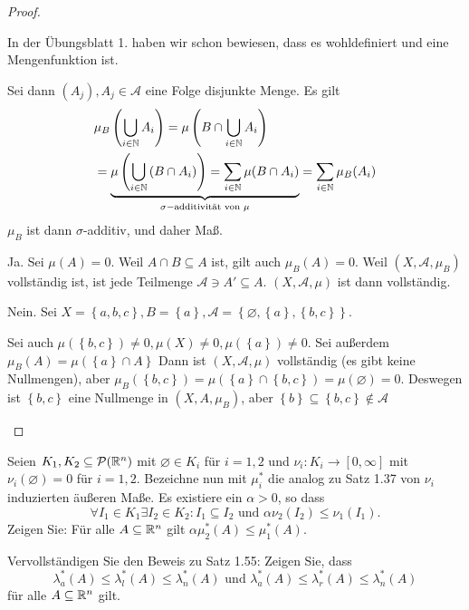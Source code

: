 \begin{proof}
	\begin{parts}
	\item In der Übungsblatt 1. haben wir schon bewiesen, dass es wohldefiniert und eine Mengenfunktion ist.

		Sei dann $(A_j), A_j\in \mathcal{A}$ eine Folge disjunkte Menge. Es gilt
	\begin{align*}
		&\mu_B\left( \bigcup_{i\in\mathbb{N}} A_i \right) =\mu\left( B\cap \bigcup_{i\in \mathbb{N}} A_i \right)\\
		&=\underbrace{\mu\left( \bigcup_{i\in \mathbb{N}} \left( B \cap A_i \right)  \right)=\sum_{i\in \mathbb{N}}\mu(B\cap A_i)}_{\sigma-\text{additivität von }\mu}=\sum_{i\in \mathbb{N}}\mu_B(A_i)
	\end{align*}
		$\mu_B$ ist dann $\sigma$-additiv, und daher Maß.
	\item Ja. Sei $\mu(A)=0$. Weil $A\cap B\subseteq A$ ist, gilt auch $\mu_B(A)=0$. Weil $(X,\mathcal{A},\mu_B)$ vollständig ist, ist jede Teilmenge $\mathcal{A}\ni A' \subseteq A$. $(X, \mathcal{A},\mu)$ ist dann vollständig.
	\item Nein. Sei $X=\left\{ a,b,c \right\},B=\left\{ a \right\}, \mathcal{A}=\left\{\varnothing, \left\{ a \right\} , \left\{ b,c \right\}  \right\} $.

		Sei auch $\mu(\left\{ b,c \right\}) \neq 0, \mu(X)\neq 0, \mu(\left\{ a \right\} )\neq 0$. Sei außerdem $\mu_B(A)=\mu\left( \left\{ a \right\}\cap A \right\}$ Dann ist $(X, \mathcal{A},\mu)$ vollständig (es gibt keine Nullmengen), aber $\mu_B(\left\{ b,c \right\} )=\mu(\left\{ a \right\} \cap \left\{ b,c \right\} )=\mu(\varnothing)=0$. Deswegen ist $\left\{ b,c \right\} $ eine Nullmenge in $(X,A,\mu_B)$, aber $\left\{ b \right\} \subseteq \left\{b ,c \right\} \not\in \mathcal{A}$\qedhere
	\end{parts}
\end{proof}
\begin{Problem}
	\begin{parts}
\item	Seien $K_1 , K_2 \subseteq \mathcal{P}(\mathbb{R}^n)$ mit $\varnothing \in K_i$ für $i = 1, 2$ und $\nu_i : K_i \to [0, \infty]$ mit $\nu_i (\varnothing) = 0$ für $i = 1, 2$. Bezeichne nun mit $\mu^*_i$ die analog zu Satz 1.37 von $\nu_i$ induzierten äußeren Maße. Es existiere ein $\alpha > 0$, so dass
	\[
		\forall I_1\in K_1\exists I_2\in K_2: I_1\subseteq I_2\text{ und }\alpha \nu_2(I_2)\le \nu_1(I_1)
	.\] 
	Zeigen Sie: F\"{u}r alle $A\subseteq \mathbb{R}^n$ gilt $\alpha\mu_2^*(A)\le \mu_1^*(A)$.
\item Vervollständigen Sie den Beweis zu Satz 1.55: Zeigen Sie, dass
	\[
		\lambda_a^*(A)\le \lambda_l^*(A)\le \lambda_n^*(A)\text{ und }\lambda_a^*(A)\le \lambda_r^* (A)\le \lambda_n^*(A)\]
		f\"{u}r alle $A\subseteq \mathbb{R}^n$ gilt.
	\end{parts}
\end{Problem}
